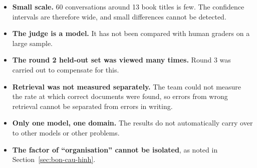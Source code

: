 \begin{itemize}
    \item \textbf{Small scale.} 60 conversations around 13 book titles is few. The confidence intervals are therefore wide, and small differences cannot be detected.
    \item \textbf{The judge is a model.} It has not been compared with human graders on a large sample.
    \item \textbf{The round 2 held-out set was viewed many times.} Round 3 was carried out to compensate for this.
    \item \textbf{Retrieval was not measured separately.} The team could not measure the rate at which correct documents were found, so errors from wrong retrieval cannot be separated from errors in writing.
    \item \textbf{Only one model, one domain.} The results do not automatically carry over to other models or other problems.
    \item \textbf{The factor of ``organisation'' cannot be isolated}, as noted in Section~\ref{sec:bon-cau-hinh}.
\end{itemize}
